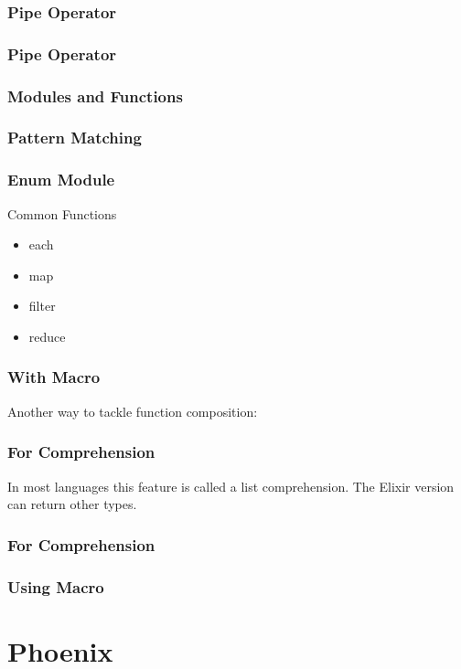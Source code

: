 \documentclass{beamer}
\begin{document}
\begin{frame}
  \frametitle{Pipe Operator}
  \Pipes
\end{frame}

\begin{frame}
  \frametitle{Pipe Operator}
  \PipesTwo
\end{frame}

\begin{frame}
\frametitle{Modules and Functions}
\Module
\end{frame}

\begin{frame}
\frametitle{Pattern Matching}

\PatternMatching
\end{frame}

\begin{frame}
  \frametitle{Enum Module}
  \EnumModule
  \begin{block}{Common Functions}
    \begin{itemize}
      \item{each}
      \item{map}
      \item{filter}
      \item{reduce}
    \end{itemize}
  \end{block}
\end{frame}

\begin{frame}
  \frametitle{With Macro}
  Another way to tackle function composition:
  \WithMacro
\end{frame}

\begin{frame}
  \frametitle{For Comprehension}
  \ForComp
\end{frame}

\begin{frame}
  In most languages this feature is called a list comprehension. The Elixir version can return other types.
  \frametitle{For Comprehension}
  \ForCompTwo
\end{frame}

\begin{frame}
  \frametitle{Using Macro}
  \Using
\end{frame}

\section{Phoenix}
\end{document}

